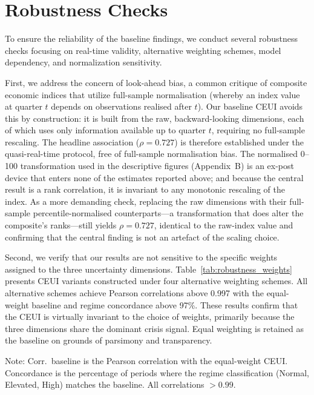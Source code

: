 \documentclass[12pt,a4paper]{article}
\theoremstyle{remark}
\begin{document}
\section{Robustness Checks}
\label{sec:robustness}

To ensure the reliability of the baseline findings, we conduct several robustness checks focusing on real-time validity, alternative weighting schemes, model dependency, and normalization sensitivity.

First, we address the concern of look-ahead bias, a common critique of composite economic indices that utilize full-sample normalisation (whereby an index value at quarter $t$ depends on observations realised after $t$). Our baseline CEUI avoids this by construction: it is built from the raw, backward-looking dimensions, each of which uses only information available up to quarter $t$, requiring no full-sample rescaling. The headline association ($\rho = 0.727$) is therefore established under the quasi-real-time protocol, free of full-sample normalisation bias. The normalised 0--100 transformation used in the descriptive figures (Appendix~B) is an ex-post device that enters none of the estimates reported above; and because the central result is a rank correlation, it is invariant to any monotonic rescaling of the index. As a more demanding check, replacing the raw dimensions with their full-sample percentile-normalised counterparts---a transformation that does alter the composite's ranks---still yields $\rho = 0.727$, identical to the raw-index value and confirming that the central finding is not an artefact of the scaling choice.

Second, we verify that our results are not sensitive to the specific weights assigned to the three uncertainty dimensions. Table~\ref{tab:robustness_weights} presents CEUI variants constructed under four alternative weighting schemes. All alternative schemes achieve Pearson correlations above 0.997 with the equal-weight baseline and regime concordance above 97\%. These results confirm that the CEUI is virtually invariant to the choice of weights, primarily because the three dimensions share the dominant crisis signal. Equal weighting is retained as the baseline on grounds of parsimony and transparency.

\begin{table}[ht]
\centering
\begin{threeparttable}
\caption{Robustness to Alternative Weighting Schemes}
\label{tab:robustness_weights}

\begin{tablenotes}
  \small \item Note: Corr.\ baseline is the Pearson correlation with the equal-weight CEUI. Concordance is the percentage of periods where the regime classification (Normal, Elevated, High) matches the baseline. All correlations $> 0.99$.
\end{tablenotes}
\end{threeparttable}
\end{table}
\end{document}
